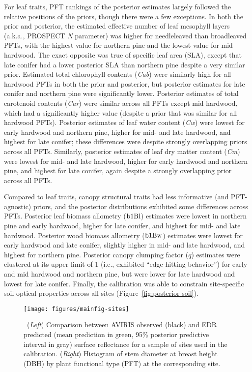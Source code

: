 For leaf traits, PFT rankings of the posterior estimates largely followed the relative positions of the priors, though there were a few exceptions.
In both the prior and posterior, the estimated effective number of leaf mesophyll layers (a.k.a., PROSPECT \emph{N} parameter) was higher for needleleaved than broadleaved PFTs, with the highest value for northern pine and the lowest value for mid hardwood.
The exact opposite was true of specific leaf area (SLA), except that late conifer had a lower posterior SLA than northern pine despite a very similar prior.
Estimated total chlorophyll contents (\emph{Cab}) were similarly high for all hardwood PFTs in both the prior and posterior,
but posterior estimates for late conifer and northern pine were significantly lower.
Posterior estimates of total carotenoid contents (\emph{Car}) were similar across all PFTs except mid hardwood, which had a significantly higher value (despite a prior that was similar for all hardwood PFTs).
Posterior estimates of leaf water content (\emph{Cw}) were lowest for early hardwood and northern pine, higher for mid- and late hardwood, and highest for late conifer; these differences were despite strongly overlapping priors across all PFTs.
Similarly, posterior estimates of leaf dry matter content (\emph{Cm}) were lowest for mid- and late hardwood, higher for early hardwood and northern pine, and highest for late conifer, again despite a strongly overlapping prior across all PFTs.

Compared to leaf traits, canopy structural traits had less informative (and PFT-agnostic) priors, and the posterior distributions exhibited some differences across PFTs.
Posterior leaf biomass allometry ($\mathrm{b1Bl}$) estimates were lowest in northern pine and early hardwood, higher for late conifer, and highest for mid- and late hardwood.
Posterior wood biomass allometry ($\mathrm{b1Bw}$) estimates were lowest for early hardwood and late conifer, slightly higher in mid- and late hardwood, and highest for northern pine.
Posterior canopy clumping factor ($q$) estimates were clustered at its upper limit of 1 (i.e., exhibited ``edge-hitting behavior'') for early and mid hardwood and northern pine, but were lower for late hardwood and lowest for late conifer.
Finally, the calibration was able to constrain site-specific soil optical properties across all sites (Figure~\ref{fig:posterior-soil}).

\begin{figure}
  \centering
  \texttt{[image: figures/mainfig-sites]}
  \caption{\label{fig:spec-error-all}\
    (\emph{Left}) Comparison between AVIRIS observed (black) and
    EDR predicted (mean prediction in green, 95\% posterior predictive interval in gray)
    surface reflectance for a sample of sites used in the calibration.
    (\emph{Right}) Histogram of stem diameter at breast height (DBH) by plant functional type (PFT) at the corresponding site.
  }
\end{figure}

